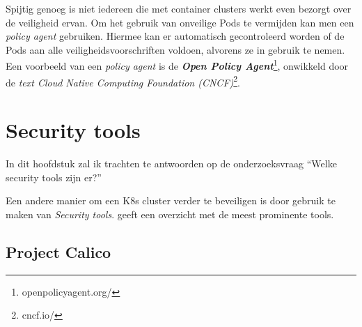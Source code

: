 Spijtig genoeg is niet iedereen die met container clusters werkt even bezorgt over de veiligheid ervan. Om het gebruik van onveilige Pods te vermijden kan men een \textit{policy agent} gebruiken. Hiermee kan er automatisch gecontroleerd worden of de Pods aan alle veiligheidsvoorschriften voldoen, alvorens ze in gebruik te nemen. Een voorbeeld van een \textit{policy agent} is de \textbf{\textit{Open Policy Agent}}\footnote{openpolicyagent.org/}, onwikkeld door de \textit{text Cloud Native Computing Foundation (CNCF)}\footnote{cncf.io/}.

%
%

\section{Security tools}

    In dit hoofdstuk zal ik trachten te antwoorden op de onderzoeksvraag ``Welke security tools zijn er?''

Een andere manier om een K8s cluster verder te beveiligen is door gebruik te maken van \textit{Security tools}.
\textcite{Taylor2019} geeft een overzicht met de meest prominente tools.

\subsection{Project Calico} \label{Calico}

